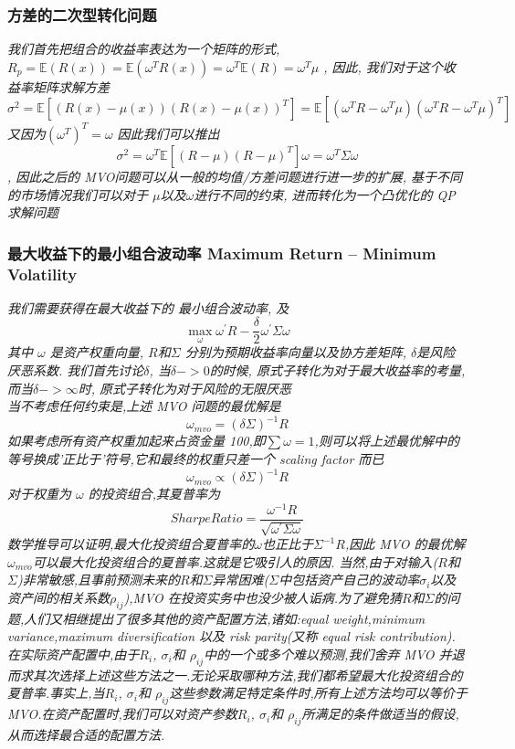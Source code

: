 \documentclass{scrartcl}
\numberwithin{equation}{section}
\begin{document}
\subsubsection{方差的二次型转化问题}
\textsl{
我们首先把组合的收益率表达为一个矩阵的形式, $R_p =  \mathbb{E} (R(x)) = \mathbb{E} (\omega^T R(x)) =\omega^T \mathbb{E} (R) =  \omega^T \mu$ , 因此, 我们对于这个收益率矩阵求解方差 $$\sigma^2  = \mathbb{E}[(R(x) - \mu (x))(R(x) - \mu (x))^T]= \mathbb{E}[(\omega^T R - \omega^T \mu)(\omega^T R - \omega^T \mu)^T]$$ 又因为$(\omega^T)^T = \omega$ 因此我们可以推出$$ \sigma^2  = \omega^T  \mathbb{E}[ (R- \mu) (R- \mu)^T] \omega = \omega^T \Sigma \omega$$, 因此之后的 MVO问题可以从一般的均值/方差问题进行进一步的扩展, 基于不同的市场情况我们可以对于 $\mu$以及$\omega$进行不同的约束, 进而转化为一个凸优化的 QP 求解问题
}


\subsubsection{最大收益下的最小组合波动率 Maximum Return – Minimum Volatility}
\textsl{我们需要获得在最大收益下的 最小组合波动率, 及
    $$\max_\omega \omega^{'} R - \frac{\delta }{2} \omega^{'}  \Sigma \omega $$其中 $\omega$ 是资产权重向量, $R$和$\Sigma$ 分别为预期收益率向量以及协方差矩阵, $\delta$是风险厌恶系数.
    我们首先讨论$\delta$, 当$\delta -> 0 $的时候, 原式子转化为对于最大收益率的考量, 而当$\delta -> \infty$时, 原式子转化为对于风险的无限厌恶\\
    当不考虑任何约束是,上述 MVO 问题的最优解是
    $$\omega_{mvo} = (\delta \Sigma)^{-1}R $$
    如果考虑所有资产权重加起来占资金量 100,即$\sum\omega =1$,则可以将上述最优解中的等号换成'正比于'符号,它和最终的权重只差一个 scaling factor 而已
    $$\omega_{mvo} \propto (\delta \Sigma)^{-1}R $$
    对于权重为 $\omega$ 的投资组合,其夏普率为
    $$SharpeRatio = \frac{\omega^{-1}R}{\sqrt{\omega^{'}  \Sigma \omega}}$$
    数学推导可以证明,最大化投资组合夏普率的$\omega$也正比于$\Sigma^{-1}R$,因此 MVO 的最优解$\omega_{mvo}$可以最大化投资组合的夏普率.这就是它吸引人的原因.
    当然,由于对输入($R$和$\Sigma$)非常敏感,且事前预测未来的$R$和$\Sigma$异常困难($\Sigma$中包括资产自己的波动率$\sigma_i$以及资产间的相关系数$\rho_{ij}$),MVO 在投资实务中也没少被人诟病.为了避免猜$R$和$\Sigma$的问题,人们又相继提出了很多其他的资产配置方法,诸如:equal weight,minimum variance,maximum diversification 以及 risk parity(又称 equal risk contribution).
    在实际资产配置中,由于$R_i$, $\sigma_i$和 $\rho_{ij}$中的一个或多个难以预测,我们舍弃 MVO 并退而求其次选择上述这些方法之一.无论采取哪种方法,我们都希望最大化投资组合的夏普率.事实上,当$R_i$, $\sigma_i$和 $\rho_{ij}$这些参数满足特定条件时,所有上述方法均可以等价于 MVO.在资产配置时,我们可以对资产参数$R_i$, $\sigma_i$和 $\rho_{ij}$所满足的条件做适当的假设,从而选择最合适的配置方法.}
\end{document}
